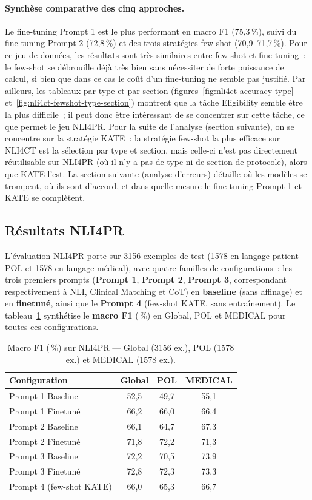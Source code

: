 \documentclass[10pt,twoside]{article}
\begin{document}
\paragraph{Synthèse comparative des cinq approches.}
Le fine-tuning Prompt 1 est le plus performant en macro F1 (75,3\,\%), suivi du fine-tuning Prompt 2 (72,8\,\%) et des trois stratégies few-shot (70,9--71,7\,\%). Pour ce jeu de données, les résultats sont très similaires entre few-shot et fine-tuning~: le few-shot se débrouille déjà très bien sans nécessiter de forte puissance de calcul, si bien que dans ce cas le coût d'un fine-tuning ne semble pas justifié. Par ailleurs, les tableaux par type et par section (figures~\ref{fig:nli4ct-accuracy-type} et~\ref{fig:nli4ct-fewshot-type-section}) montrent que la tâche Eligibility semble être la plus difficile~; il peut donc être intéressant de se concentrer sur cette tâche, ce que permet le jeu NLI4PR. Pour la suite de l'analyse (section suivante), on se concentre sur la stratégie KATE~: la stratégie few-shot la plus efficace sur NLI4CT est la sélection par type et section, mais celle-ci n'est pas directement réutilisable sur NLI4PR (où il n'y a pas de type ni de section de protocole), alors que KATE l'est. La section suivante (analyse d'erreurs) détaille où les modèles se trompent, où ils sont d'accord, et dans quelle mesure le fine-tuning Prompt 1 et KATE se complètent.

\subsection{Résultats NLI4PR}
L'évaluation NLI4PR porte sur 3156 exemples de test (1578 en langage patient POL et 1578 en langage médical), avec quatre familles de configurations~: les trois premiers prompts (\textbf{Prompt 1}, \textbf{Prompt 2}, \textbf{Prompt 3}, correspondant respectivement à NLI, Clinical Matching et CoT) en \textbf{baseline} (sans affinage) et en \textbf{finetuné}, ainsi que le \textbf{Prompt 4} (few-shot KATE, sans entraînement). Le tableau~\ref{tab:nli4pr-accuracy} synthétise le \textbf{macro F1} (\,\%) en Global, POL et MEDICAL pour toutes ces configurations.

\begin{table}[htbp]
\centering
\caption{Macro F1 (\,\%) sur NLI4PR — Global (3156 ex.), POL (1578 ex.) et MEDICAL (1578 ex.).}
\label{tab:nli4pr-accuracy}
\begin{tabular}{lccc}
\toprule
Configuration & Global & POL & MEDICAL \\
\midrule
Prompt 1 Baseline & 52,5 & 49,7 & 55,1 \\
Prompt 1 Finetuné & 66,2 & 66,0 & 66,4 \\
Prompt 2 Baseline & 66,1 & 64,7 & 67,3 \\
Prompt 2 Finetuné & 71,8 & 72,2 & 71,3 \\
Prompt 3 Baseline & 72,2 & 70,5 & 73,9 \\
Prompt 3 Finetuné & 72,8 & 72,3 & 73,3 \\
Prompt 4 (few-shot KATE) & 66,0 & 65,3 & 66,7 \\
\bottomrule
\end{tabular}
\end{table}
\end{document}
